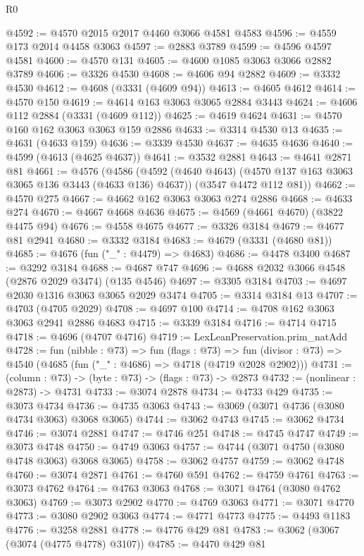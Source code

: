 \begin{lexlean}{R0}
\begin{coremodule}
@4592 := @4570 @2015 @2017 @4460 @3066 @4581 @4583
@4596 := @4559 @173 @2014 @4458 @3063
@4597 := @2883 @3789
@4599 := @4596 @4597 @4581
@4600 := @4570 @131
@4605 := @4600 @1085 @3063 @3066 @2882 @3789
@4606 := @3326 @4530
@4608 := @4606 @94 @2882
@4609 := @3332 @4530
@4612 := @4608 (@3331 (@4609 @94))
@4613 := @4605 @4612
@4614 := @4570 @150
@4619 := @4614 @163 @3063 @3065 @2884 @3443
@4624 := @4606 @112 @2884 (@3331 (@4609 @112))
@4625 := @4619 @4624
@4631 := @4570 @160 @162 @3063 @3063 @159 @2886
@4633 := @3314 @4530 @13
@4635 := @4631 (@4633 @159)
@4636 := @3339 @4530
@4637 := @4635 @4636
@4640 := @4599 (@4613 (@4625 @4637))
@4641 := @3532 @2881
@4643 := @4641 @2871 @81
@4661 := @4576
    (@4586
      (@4592 (@4640 @4643) (@4570 @137 @163 @3063 @3065 @136 @3443 (@4633 @136) @4637))
      (@3547 @4472 @112 @81))
@4662 := @4570 @275
@4667 := @4662 @162 @3063 @3063 @274 @2886
@4668 := @4633 @274
@4670 := @4667 @4668 @4636
@4675 := @4569 (@4661 @4670) (@3822 @4475 @94)
@4676 := @4558 @4675
@4677 := @3326 @3184
@4679 := @4677 @81 @2941
@4680 := @3332 @3184
@4683 := @4679 (@3331 (@4680 @81))
@4685 := @4676 (fun ("_" : @4479) => @4683)
@4686 := @4478 @3400
@4687 := @3292 @3184
@4688 := @4687 @747
@4696 := @4688 @2032 @3066 @4548 (@2876 @2029 @3474) (@135 @4546)
@4697 := @3305 @3184
@4703 := @4697 @2030 @1316 @3063 @3065 @2029 @3474
@4705 := @3314 @3184 @13
@4707 := @4703 (@4705 @2029)
@4708 := @4697 @100
@4714 := @4708 @162 @3063 @3063 @2941 @2886 @4683
@4715 := @3339 @3184
@4716 := @4714 @4715
@4718 := @4696 (@4707 @4716)
@4719 := LexLeanPreservation.prim_natAdd
@4728 := fun (nibble : @73) =>
  fun (flags : @73) =>
  fun (divisor : @73) => @4540 (@4685 (fun ("_" : @4686) => @4718 (@4719 @2028 @2902)))
@4731 := (column : @73) -> (byte : @73) -> (flags : @73) -> @2873
@4732 := (nonlinear : @2873) -> @4731
@4733 := @3074 @2878
@4734 := @4733 @429
@4735 := @3073 @4734
@4736 := @4735 @3063
@4743 := @3069 (@3071 @4736 (@3080 @4734 @3063) @3068 @3065)
@4744 := @3062 @4743
@4745 := @3062 @4734
@4746 := @3074 @2881
@4747 := @4746 @251
@4748 := @4745 @4747
@4749 := @3073 @4748
@4750 := @4749 @3063
@4757 := @4744 (@3071 @4750 (@3080 @4748 @3063) @3068 @3065)
@4758 := @3062 @4757
@4759 := @3062 @4748
@4760 := @3074 @2871
@4761 := @4760 @591
@4762 := @4759 @4761
@4763 := @3073 @4762
@4764 := @4763 @3063
@4768 := @3071 @4764 (@3080 @4762 @3063)
@4769 := @3073 @2902
@4770 := @4769 @3063
@4771 := @3071 @4770
@4773 := @3080 @2902 @3063
@4774 := @4771 @4773
@4775 := @4493 @1183
@4776 := @3258 @2881
@4778 := @4776 @429 @81
@4783 := @3062 (@3067 (@3074 (@4775 @4778) @3107))
@4785 := @4470 @429 @81

\end{coremodule}
\end{lexlean}
